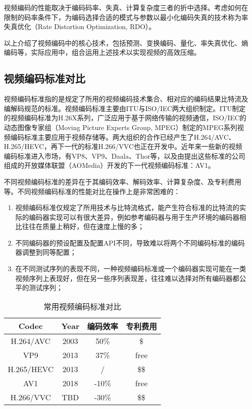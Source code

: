 视频编码的性能取决于编码码率、失真、计算复杂度三者的折中选择。考虑如何在限制的码率条件下，为编码选择合适的模式与参数以最小化编码失真的技术称为率失真优化\cite{sullivanRatedistortionOptimizationVideo1998}（Rate Distortion Optimization, RDO）。

以上介绍了视频编码中的核心技术，包括预测、变换编码、量化、率失真优化、熵编码等，实际应用中，组合运用上述技术以实现视频的高效压缩。
\subsection{视频编码标准对比\label{sec:codec-comparison}}

视频编码标准指的是规定了所用的视频编码技术集合、相对应的编码结果比特流及编解码规范的标准。视频编码标准主要由ITU与ISO/IEC两大组织制定。ITU制定的视频编码标准为H.26X系列，广泛应用于基于网络传输的视频通信，ISO/IEC的动态图像专家组（Moving Picture Experts Group, MPEG）制定的MPEG系列视频编码标准主要应用于视频存储等。两大组织的合作已经产生了H.264/AVC、H.265/HEVC，再下一代的标准H.266/VVC也正在开发中。近年来一些新的视频编码标准进入市场，有VP8、VP9、Daala、Thor等，以及由提出这些标准的公司组成的开放媒体联盟（AOMedia）开发的下一代视频编码标准：AV1。

不同视频编码标准的差异在于其编码效率、解码效率、计算复杂度、及专利费用等。不同视频编码标准的性能对比在操作上是非常困难的\cite{laudeComprehensiveVideoCodec2019}：
\begin{enumerate} [label=\arabic*)]
  \item 视频编码标准仅规定了所用技术与比特流格式，能产生符合标准的比特流的实际的编码器实现可以有很大差异，例如参考编码器与用于生产环境的编码器相比往往在质量上稍好，但在速度上慢的多；
  \item 不同编码器的预设配置及配置API不同，导致难以将两个不同编码标准的编码器调整到同等配置；
  \item 在不同测试序列的表现不同，一种视频编码标准或一个编码器实现可能在一类视频序列上表现好，但在另一些序列表现差，往往难以选择对所有编码器都公平的测试序列；
\end{enumerate}

\begin{table}[!hpt]
  \renewcommand{\arraystretch}{0.9}
  \caption{常用视频编码标准对比}
  \label{tab:codec}
  \centering
  \begin{tabular}{cccc}
  	\toprule
  	  Codec    & Year & 编码效率  & 专利费用 \\ \midrule
  	H.264/AVC  & 2003 & 50\%  &  \$  \\ %
  	   VP9     & 2013 & 37\%  & free \\
  	H.265/HEVC & 2013 &   /   & \$\$ \\
  	   AV1     & 2018 & -10\% & free \\
  	H.266/VVC  & TBD  & -30\% & \$\$ \\ \bottomrule
  \end{tabular}
\end{table}

